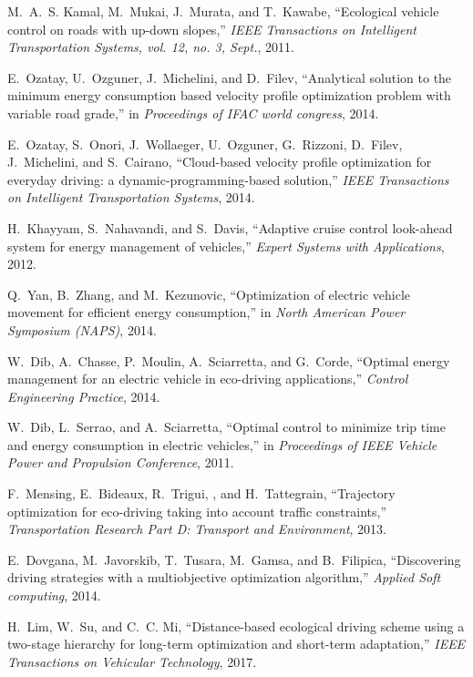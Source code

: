 M.~A.~S. Kamal, M.~Mukai, J.~Murata, and T.~Kawabe, ``Ecological vehicle
  control on roads with up-down slopes,'' {\em IEEE Transactions on Intelligent
  Transportation Systems, vol. 12, no. 3, Sept.}, 2011.

E.~Ozatay, U.~Ozguner, J.~Michelini, and D.~Filev, ``Analytical solution to the
  minimum energy consumption based velocity profile optimization problem with
  variable road grade,'' in {\em Proceedings of IFAC world congress}, 2014.

E.~Ozatay, S.~Onori, J.~Wollaeger, U.~Ozguner, G.~Rizzoni, D.~Filev,
  J.~Michelini, and S.~Cairano, ``Cloud-based velocity profile optimization for
  everyday driving: a dynamic-programming-based solution,'' {\em IEEE
  Transactions on Intelligent Transportation Systems}, 2014.

H.~Khayyam, S.~Nahavandi, and S.~Davis, ``Adaptive cruise control look-ahead
  system for energy management of vehicles,'' {\em Expert Systems with
  Applications}, 2012.

Q.~Yan, B.~Zhang, and M.~Kezunovic, ``Optimization of electric vehicle movement
  for efficient energy consumption,'' in {\em North American Power Symposium
  (NAPS)}, 2014.

W.~Dib, A.~Chasse, P.~Moulin, A.~Sciarretta, and G.~Corde, ``Optimal energy
  management for an electric vehicle in eco-driving applications,'' {\em
  Control Engineering Practice}, 2014.

W.~Dib, L.~Serrao, and A.~Sciarretta, ``Optimal control to minimize trip time
  and energy consumption in electric vehicles,'' in {\em Proceedings of IEEE
  Vehicle Power and Propulsion Conference}, 2011.

F.~Mensing, E.~Bideaux, R.~Trigui, , and H.~Tattegrain, ``Trajectory
  optimization for eco-driving taking into account traffic constraints,'' {\em
  Transportation Research Part D: Transport and Environment}, 2013.

E.~Dovgana, M.~Javorskib, T.~Tusara, M.~Gamsa, and B.~Filipica, ``Discovering
  driving strategies with a multiobjective optimization algorithm,'' {\em
  Applied Soft computing}, 2014.

H.~Lim, W.~Su, and C.~C. Mi, ``Distance-based ecological driving scheme using a
  two-stage hierarchy for long-term optimization and short-term adaptation,''
  {\em IEEE Transactions on Vehicular Technology}, 2017.

